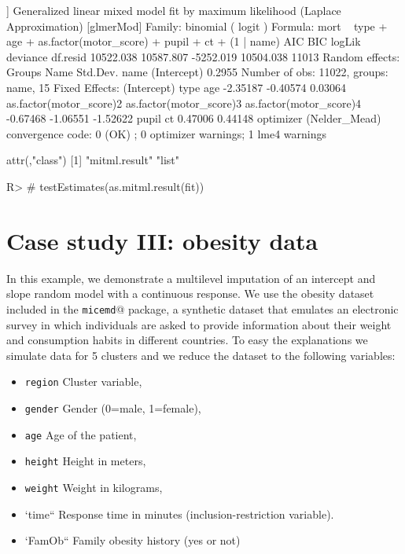 \documentclass[
]{jss}
\providecommand{\tightlist}{%
  \setlength{\itemsep}{0pt}\setlength{\parskip}{0pt}}
\begin{document}
\begin{CodeChunk}
\begin{CodeOutput}
[[5]]
Generalized linear mixed model fit by maximum likelihood (Laplace
  Approximation) [glmerMod]
 Family: binomial  ( logit )
Formula: mort ~ type + age + as.factor(motor_score) + pupil + ct + (1 |  
    name)
      AIC       BIC    logLik  deviance  df.resid 
10522.038 10587.807 -5252.019 10504.038     11013 
Random effects:
 Groups Name        Std.Dev.
 name   (Intercept) 0.2955  
Number of obs: 11022, groups:  name, 15
Fixed Effects:
            (Intercept)                     type                      age  
               -2.35187                 -0.40574                  0.03064  
as.factor(motor_score)2  as.factor(motor_score)3  as.factor(motor_score)4  
               -0.67468                 -1.06551                 -1.52622  
                  pupil                       ct  
                0.47006                  0.44148  
optimizer (Nelder_Mead) convergence code: 0 (OK) ; 0 optimizer warnings; 1 lme4 warnings 

attr(,"class")
[1] "mitml.result" "list"        
\end{CodeOutput}
\begin{CodeInput}
R> # testEstimates(as.mitml.result(fit))
\end{CodeInput}
\end{CodeChunk}

\hypertarget{case-study-iii-obesity-data}{%
\section{Case study III: obesity
data}\label{case-study-iii-obesity-data}}

In this example, we demonstrate a multilevel imputation of an intercept
and slope random model with a continuous response. We use the obesity
dataset included in the \texttt{micemd}@ package, a synthetic dataset
that emulates an electronic survey in which individuals are asked to
provide information about their weight and consumption habits in
different countries. To easy the explanations we simulate data for 5
clusters and we reduce the dataset to the following variables:

\begin{itemize}
\tightlist
\item
  \texttt{region} Cluster variable,
\item
  \texttt{gender} Gender (0=male, 1=female),
\item
  \texttt{age} Age of the patient,
\item
  \texttt{height} Height in meters,
\item
  \texttt{weight} Weight in kilograms,
\item
  `time`` Response time in minutes (inclusion-restriction variable).
\item
  `FamOb`` Family obesity history (yes or not)
\end{itemize}
\end{document}
